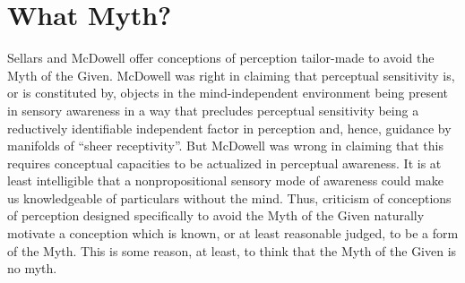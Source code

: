 \documentclass[12pt]{article}
\begin{document}

\section{What Myth?} %
\label{sec:what_myth_}

Sellars and McDowell offer conceptions of perception tailor-made to avoid the Myth of the Given. McDowell was right in claiming that perceptual sensitivity is, or is constituted by, objects in the mind-independent environment being present in sensory awareness in a way that precludes perceptual sensitivity being a reductively identifiable independent factor in perception and, hence, guidance by manifolds of “sheer receptivity”. But McDowell was wrong in claiming that this requires conceptual capacities to be actualized in perceptual awareness. It is at least intelligible that a nonpropositional sensory mode of awareness could make us knowledgeable of particulars without the mind. Thus, criticism of conceptions of perception designed specifically to avoid the Myth of the Given naturally motivate a conception which is known, or at least reasonable judged, to be a form of the Myth. This is some reason, at least, to think that the Myth of the Given is no myth. 

\end{document}
